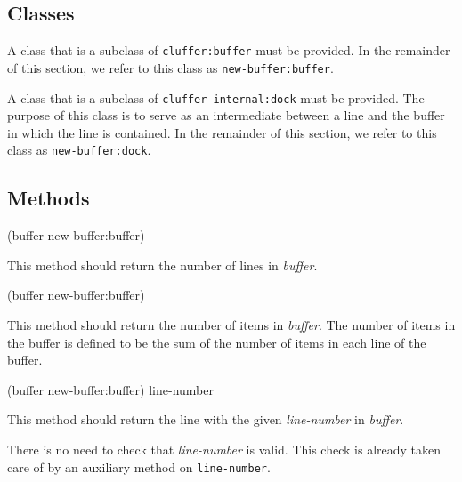 \subsection{Classes}

A class that is a subclass of \texttt{cluffer:buffer} must be
provided.  In the remainder of this section, we refer to this class as
\texttt{new-buffer:buffer}.

A class that is a subclass of \texttt{cluffer-internal:dock} must be
provided.  The purpose of this class is to serve as an intermediate
between a line and the buffer in which the line is contained.
In the remainder of this section, we refer to this class as
\texttt{new-buffer:dock}.

\subsection{Methods}

 {(buffer new-buffer:buffer)}

This method should return the number of lines in \textit{buffer}.

 {(buffer new-buffer:buffer)}

This method should return the number of items in \textit{buffer}.
The number of items in the buffer is defined to be the sum of the
number of items in each line of the buffer.

 {(buffer new-buffer:buffer) line-number}

This method should return the line with the given \textit{line-number}
in \textit{buffer}.

There is no need to check that \textit{line-number} is valid.
This check is already taken care of by an auxiliary method on
\texttt{line-number}.
